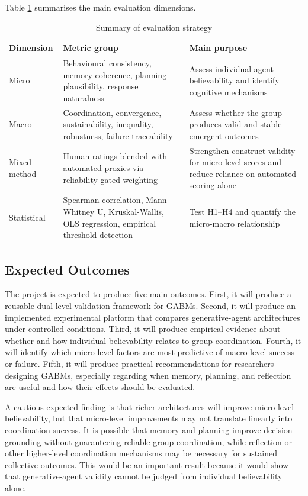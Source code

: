 \documentclass[11pt]{article}
\begin{document}
Table \ref{tab:metrics} summarises the main evaluation dimensions.

\begin{table}[h]
\centering
\caption{Summary of evaluation strategy}
\label{tab:metrics}
\begin{tabular}{p{}p{}p{}}
\toprule
Dimension & Metric group & Main purpose \\
\midrule
Micro & Behavioural consistency, memory coherence, planning plausibility, response naturalness & Assess individual agent believability and identify cognitive mechanisms \\
Macro & Coordination, convergence, sustainability, inequality, robustness, failure traceability & Assess whether the group produces valid and stable emergent outcomes \\
Mixed-method & Human ratings blended with automated proxies via reliability-gated weighting & Strengthen construct validity for micro-level scores and reduce reliance on automated scoring alone \\
Statistical & Spearman correlation, Mann-Whitney U, Kruskal-Wallis, OLS regression, empirical threshold detection & Test H1--H4 and quantify the micro-macro relationship \\
\bottomrule
\end{tabular}
\end{table}

\subsection{Expected Outcomes}
The project is expected to produce five main outcomes. First, it will produce a reusable dual-level validation framework for GABMs. Second, it will produce an implemented experimental platform that compares generative-agent architectures under controlled conditions. Third, it will produce empirical evidence about whether and how individual believability relates to group coordination. Fourth, it will identify which micro-level factors are most predictive of macro-level success or failure. Fifth, it will produce practical recommendations for researchers designing GABMs, especially regarding when memory, planning, and reflection are useful and how their effects should be evaluated.

A cautious expected finding is that richer architectures will improve micro-level believability, but that micro-level improvements may not translate linearly into coordination success. It is possible that memory and planning improve decision grounding without guaranteeing reliable group coordination, while reflection or other higher-level coordination mechanisms may be necessary for sustained collective outcomes. This would be an important result because it would show that generative-agent validity cannot be judged from individual believability alone.
\end{document}
